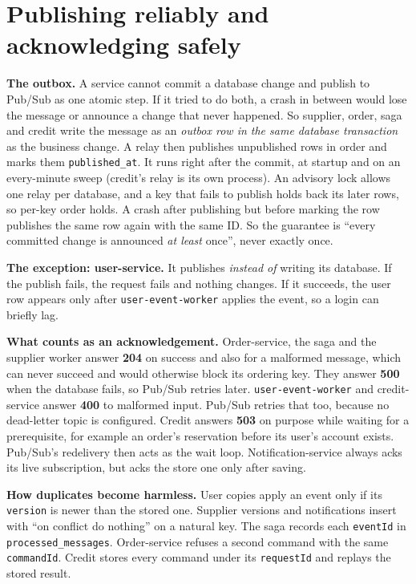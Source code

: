 \documentclass[11pt,a4paper]{article}
\newcommand{\code}[1]{\nolinkurl{#1}}
\begin{document}
\section{Publishing reliably and acknowledging safely}

\textbf{The outbox.} A service cannot commit a database change and publish to Pub/Sub as one
atomic step. If it tried to do both, a crash in between would lose the message or announce a
change that never happened. So supplier, order, saga and credit write the message as an
\emph{outbox row in the same database transaction} as the business change. A relay then
publishes unpublished rows in order and marks them \code{published_at}. It runs right after
the commit, at startup and on an every-minute sweep (credit's relay is its own process). An
advisory lock allows one relay per database, and a key that fails to publish holds back its
later rows, so per-key order holds. A crash after publishing but before marking the row
publishes the same row again with the same ID. So the guarantee is ``every committed change is
announced \emph{at least} once'', never exactly once.

\textbf{The exception: user-service.} It publishes \emph{instead of} writing its database. If
the publish fails, the request fails and nothing changes. If it succeeds, the user row appears
only after \code{user-event-worker} applies the event, so a login can briefly lag.

\textbf{What counts as an acknowledgement.} Order-service, the saga and the supplier worker
answer \textbf{204} on success and also for a malformed message, which can never succeed and
would otherwise block its ordering key. They answer \textbf{500} when the database fails, so
Pub/Sub retries later. \code{user-event-worker} and credit-service answer \textbf{400} to
malformed input. Pub/Sub retries that too, because no dead-letter topic is configured. Credit
answers \textbf{503} on purpose while waiting for a prerequisite, for example an order's
reservation before its user's account exists. Pub/Sub's redelivery then acts as the wait loop.
Notification-service always acks its live subscription, but acks the store one only after
saving.

\textbf{How duplicates become harmless.} User copies apply an event only if its \code{version}
is newer than the stored one. Supplier versions and notifications insert with ``on conflict do
nothing'' on a natural key. The saga records each \code{eventId} in \code{processed_messages}.
Order-service refuses a second command with the same \code{commandId}. Credit stores every
command under its \code{requestId} and replays the stored result.
\end{document}
